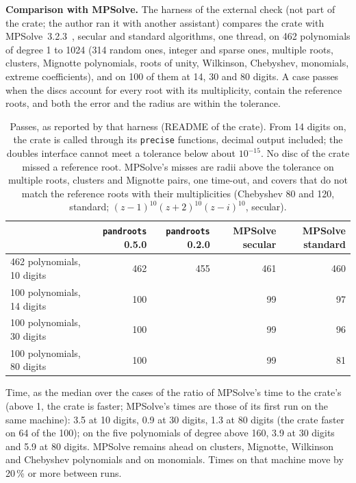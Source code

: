 \documentclass[10pt,a4paper]{article}
\theoremstyle{definition}
\numberwithin{equation}{section}
\begin{document}
\textbf{Comparison with MPSolve.} The harness of the external check (not part of the crate; the author
ran it with another assistant) compares the crate with MPSolve~3.2.3~\cite{mpsolve}, secular and
standard algorithms, one thread, on 462 polynomials of degree 1 to 1024 (314 random ones, integer and sparse ones, multiple roots, clusters, Mignotte polynomials, roots of
unity, Wilkinson, Chebyshev, monomials, extreme coefficients), and on 100 of them at 14, 30
and 80 digits. A case passes when the discs account for every root with its multiplicity, contain the
reference roots, and both the error and the radius are within the tolerance.
\begin{table}[H]\centering\small
\begin{tabular}{lrrrr}
\toprule
 & \texttt{pandroots} 0.5.0 & \texttt{pandroots} 0.2.0 & MPSolve secular & MPSolve standard\\
\midrule
462 polynomials, 10 digits & 462 & 455 & 461 & 460\\
100 polynomials, 14 digits & 100 & & 99 & 97\\
100 polynomials, 30 digits & 100 & & 99 & 96\\
100 polynomials, 80 digits & 100 & & 99 & 81\\
\bottomrule
\end{tabular}
\caption{Passes, as reported by that harness (README of the crate). From 14 digits on, the crate is
called through its \texttt{precise} functions, decimal output included; the doubles interface cannot
meet a tolerance below about $10^{-15}$. No disc of the crate missed a reference root. MPSolve's misses
are radii above the tolerance on multiple roots, clusters and Mignotte pairs, one time-out, and covers
that do not match the reference roots with their multiplicities (Chebyshev 80 and 120, standard;
$(z-1)^{10}(z+2)^{10}(z-i)^{10}$, secular).}\label{tab:mpsolve}
\end{table}
Time, as the median over the cases of the ratio of MPSolve's time to the crate's (above 1, the crate is
faster; MPSolve's times are those of its first run on the same machine): 3.5 at 10 digits, 0.9 at 30
digits, 1.3 at 80 digits (the crate faster on 64 of the 100); on the five polynomials of degree above
160, 3.9 at 30 digits and 5.9 at 80 digits. MPSolve remains ahead on clusters, Mignotte, Wilkinson and
Chebyshev polynomials and on monomials. Times on that machine move by 20\,\% or more between runs.
\end{document}
